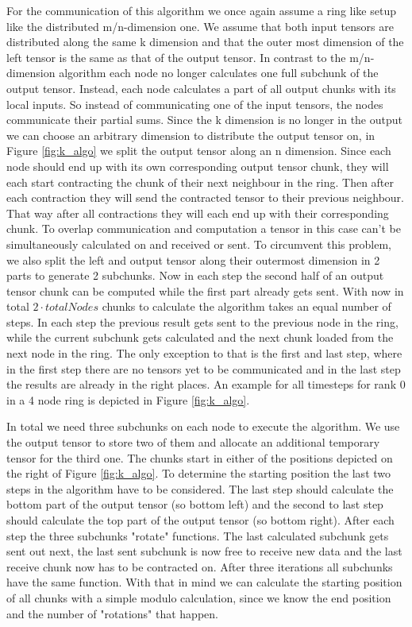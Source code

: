 For the communication of this algorithm we once again assume a ring like setup like the distributed m/n-dimension one.
We assume that both input tensors are distributed along the same k dimension and that the outer most dimension of the left tensor is the same as that of the output tensor.
In contrast to the m/n-dimension algorithm each node no longer calculates one full subchunk of the output tensor.
Instead, each node calculates a part of all output chunks with its local inputs.
So instead of communicating one of the input tensors, the nodes communicate their partial sums.
Since the k dimension is no longer in the output we can choose an arbitrary dimension to distribute the output tensor on, in Figure \ref{fig:k_algo} we split the output tensor along an n dimension.
Since each node should end up with its own corresponding output tensor chunk, they will each start contracting the chunk of their next neighbour in the ring.
Then after each contraction they will send the contracted tensor to their previous neighbour.
That way after all contractions they will each end up with their corresponding chunk.
To overlap communication and computation a tensor in this case can't be simultaneously calculated on and received or sent.
To circumvent this problem, we also split the left and output tensor along their outermost dimension in 2 parts to generate 2 subchunks.
Now in each step the second half of an output tensor chunk can be computed while the first part already gets sent.
With now in total $2 \cdot totalNodes$ chunks to calculate the algorithm takes an equal number of steps.
In each step the previous result gets sent to the previous node in the ring, while the current subchunk gets calculated and the next chunk loaded from the next node in the ring.
The only exception to that is the first and last step, where in the first step there are no tensors yet to be communicated and in the last step the results are already in the right places.
An example for all timesteps for rank 0 in a 4 node ring is depicted in Figure \ref{fig:k_algo}.

In total we need three subchunks on each node to execute the algorithm.
We use the output tensor to store two of them and allocate an additional temporary tensor for the third one.
The chunks start in either of the positions depicted on the right of Figure \ref{fig:k_algo}.
To determine the starting position the last two steps in the algorithm have to be considered.
The last step should calculate the bottom part of the output tensor (so bottom left) and the second to last step should calculate the top part of the output tensor (so bottom right).
After each step the three subchunks "rotate" functions.
The last calculated subchunk gets sent out next, the last sent subchunk is now free to receive new data and the last receive chunk now has to be contracted on.
After three iterations all subchunks have the same function.
With that in mind we can calculate the starting position of all chunks with a simple modulo calculation, since we know the end position and the number of "rotations" that happen.

